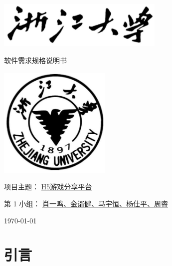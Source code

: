 \documentclass[12pt]{ctexart} %
\begin{document}
\begin{titlepage}
  \centering %
  \includegraphics[width=0.6\textwidth]{zjutitle.jpg} %
  
  \vspace{2cm} %
  
  {\fontsize{36}{48}\selectfont{} 软件需求规格说明书} %
  
  \vspace{2cm} %
  
  \includegraphics[width=0.4\textwidth]{zjulogo.jpg} %
  
  \vspace{2cm}
  
  {\Huge{} 项目主题： \underline{H5游戏分享平台}} %
  
  \vspace{1cm}

  {\Large{} 第 1 小组： \underline{肖一鸣、金谞健、马宇恒、杨仕平、周睿}} %
  
  \vspace{1cm} %
  
  {\Large{} \today} %

\end{titlepage}

\newpage
\tableofcontents %
\newpage

\section{引言}
\end{document}
